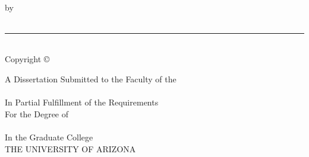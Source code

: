 \thispagestyle{empty} %

\null
\vfill

\begin{center}
\MakeUppercase\CompleteTitle \\ 
\vspace*{1.5em}
by\\
\vspace*{1.5em}
\FullName \\
\vspace*{2em}

\rule{3in}{1pt}\\
\vspace*{-1em}
{\small Copyright \copyright\ \FullName\ \DegreeYear} \\
\vspace*{2em}

A Dissertation Submitted to the Faculty of the\\
\vspace*{1.5em}
\MakeUppercase\DepartmentName \\
\vspace*{1.5em}
In Partial Fulfillment of the Requirements\\
\vspace*{0.5em}
For the Degree of\\
\vspace*{1.5em}
\MakeUppercase\DegreeType \\
\vspace*{1.5em}
In the Graduate College\\
\vspace*{1.5em}
THE UNIVERSITY OF ARIZONA\\
\vspace*{3em}
\DegreeYear
\end{center}

\vfill %
